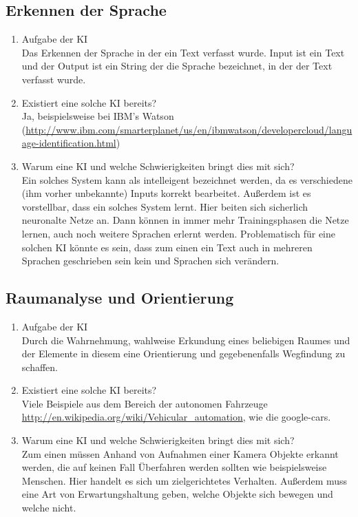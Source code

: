 \documentclass[a4paper,11pt,fleqn]{scrartcl}
\begin{document}
\subsection*{Erkennen der Sprache}
\begin{enumerate}
	\item Aufgabe der KI \\
	Das Erkennen der Sprache in der ein Text verfasst wurde. Input ist ein Text und der Output ist ein String der die Sprache bezeichnet, in der der Text verfasst wurde. 
	\item Existiert eine solche KI bereits? \\
	Ja, beispielsweise bei IBM's Watson (\url{http://www.ibm.com/smarterplanet/us/en/ibmwatson/developercloud/language-identification.html})
	\item Warum eine KI und welche Schwierigkeiten bringt dies mit sich? \\
	Ein solches System kann als intelleigent bezeichnet werden, da es verschiedene (ihm vorher unbekannte) Inputs korrekt bearbeitet. Außerdem ist es vorstellbar, dass ein solches System lernt. Hier beiten sich sicherlich neuronalte Netze an. Dann können in immer mehr Trainingsphasen die Netze lernen, auch noch weitere Sprachen erlernt werden. Problematisch für eine solchen KI könnte es sein, dass zum einen ein Text auch in mehreren Sprachen geschrieben sein kein und Sprachen sich verändern.     
\end{enumerate}

\subsection*{Raumanalyse und Orientierung}
\begin{enumerate}
	\item Aufgabe der KI \\
	Durch die Wahrnehmung, wahlweise Erkundung eines beliebigen Raumes und der Elemente in diesem eine Orientierung und gegebenenfalls Wegfindung zu schaffen.
	\item Existiert eine solche KI bereits? \\
	 Viele Beispiele aus dem Bereich der autonomen Fahrzeuge \url{http://en.wikipedia.org/wiki/Vehicular_automation}, wie die google-cars.
	\item Warum eine KI und welche Schwierigkeiten bringt dies mit sich? \\
	Zum einen müssen Anhand von Aufnahmen einer Kamera Objekte erkannt werden, die auf keinen Fall Überfahren werden sollten wie beispielsweise Menschen. Hier handelt es sich um zielgerichtetes Verhalten. Außerdem muss eine Art von Erwartungshaltung geben, welche Objekte sich bewegen und welche nicht.   
\end{enumerate}
\end{document}
